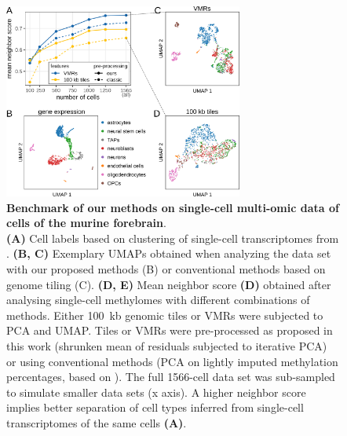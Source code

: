 \documentclass[twocolumn,10pt]{article}
\begin{document}
\begin{figure}[t]
    \begin{center}
        \includegraphics[width=0.7\textwidth]{figures/Fig_benchmark.png}
    \end{center}
    \caption{\small \textbf{Benchmark of our methods on single-cell multi-omic data of cells of the murine forebrain}.\\
    \textbf{(A)} Cell labels based on clustering of single-cell transcriptomes from \citet{kremer_scnmt}.
    \textbf{(B, C)} Exemplary UMAPs obtained when analyzing the data set with our proposed methods (B) or conventional methods based on genome tiling (C).
    \textbf{(D, E)} Mean neighbor score \textbf{(D)} obtained after analysing single-cell methylomes with different combinations of methods.
    Either 100~kb genomic tiles or VMRs were subjected to PCA and UMAP.
    Tiles or VMRs were pre-processed as proposed in this work (shrunken mean of residuals subjected to iterative PCA) or using conventional methods (PCA on lightly imputed methylation percentages, based on \citep{luo2017single}).
    The full 1566-cell data set was sub-sampled to simulate smaller data sets (x axis).
    A higher neighbor score implies better separation of cell types inferred from single-cell transcriptomes of the same cells \textbf{(A)}.
    }
    \label{fig:score}
\end{figure}
\end{document}
